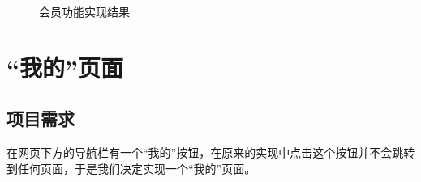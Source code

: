 \begin{figure}[H]
{    }
    \centering
    \caption{会员功能实现结果}
\end{figure}

\section{“我的”页面}
\subsection{项目需求}
在网页下方的导航栏有一个“我的”按钮，在原来的实现中点击这个按钮并不会跳转到任何页面，于是我们决定实现一个“我的”页面。

